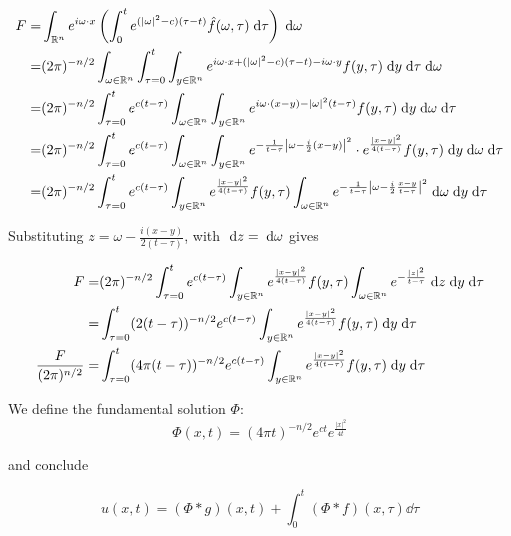\begin{align*}
F = &\int_{\mathbb{R}^n} e^{i \omega \cdot x} \left( \int_0^t e^{(|\omega|^2 - c) (\tau - t)} \hat{f}(\omega, \tau) \;\mathrm{d}\tau \right) \;\mathrm{d}\omega\\
  = &(2 \pi)^{-n / 2} \int_{\omega \in \mathbb{R}^n}
                       \int_{\tau = 0}^t
                         \int_{y \in \mathbb{R}^n}
                           e^{i \omega \cdot x + (|\omega|^2 - c) (\tau - t) - i \omega \cdot y} f(y, \tau) \;\mathrm{d}y \;\mathrm{d}\tau \;\mathrm{d}\omega\\
  = &(2 \pi)^{-n / 2} \int_{\tau = 0}^t
                       e^{c (t - \tau)}
                       \int_{\omega \in \mathbb{R}^n}
                         \int_{y \in \mathbb{R}^n}
                           e^{i \omega \cdot (x - y) - |\omega|^2 (t - \tau)} f(y, \tau) \;\mathrm{d}y \;\mathrm{d}\omega \;\mathrm{d}\tau\\
  = &(2 \pi)^{-n / 2} \int_{\tau = 0}^t
                       e^{c (t - \tau)}
                       \int_{\omega \in \mathbb{R}^n}
                         \int_{y \in \mathbb{R}^n}
                           e^{-\frac{1}{t - \tau} \left| \omega - \frac{i}{2} (x - y)\right|^2}
                           \cdot e^{\frac{|x - y|^2}{4 (t - \tau)}} f(y, \tau) \;\mathrm{d}y \;\mathrm{d}\omega \;\mathrm{d}\tau\\
  = &(2 \pi)^{-n / 2} \int_{\tau = 0}^t
                       e^{c (t - \tau)}
                       \int_{y \in \mathbb{R}^n}
                         e^{\frac{|x - y|^2}{4 (t - \tau)}} f(y, \tau)
                         \int_{\omega \in \mathbb{R}^n}
                           e^{-\frac{1}{t - \tau} \left| \omega - \frac{i}{2} \frac{x - y}{t - \tau}\right|^2} \;\mathrm{d}\omega \;\mathrm{d}y \;\mathrm{d}\tau\\
\end{align*}

Substituting $z = \omega - \frac{i (x - y)}{2 (t - \tau)}$, with $\;\mathrm{d}z = \;\mathrm{d}\omega$ gives

\begin{align*}
F = &(2 \pi)^{-n / 2} \int_{\tau = 0}^t
                       e^{c (t - \tau)}
                       \int_{y \in \mathbb{R}^n}
                         e^{\frac{|x - y|^2}{4 (t - \tau)}} f(y, \tau)
                         \int_{\omega \in \mathbb{R}^n}
                           e^{-\frac{|z|^2}{t - \tau}} \;\mathrm{d}z \;\mathrm{d}y \;\mathrm{d}\tau\\
  = &\int_{\tau = 0}^t (2 (t - \tau))^{-n / 2} e^{c (t - \tau)}
       \int_{y \in \mathbb{R}^n} e^{\frac{|x - y|^2}{4 (t - \tau)}} f(y, \tau) \;\mathrm{d}y \;\mathrm{d}\tau\\
\frac{F}{(2 \pi)^{n / 2}} = &\int_{\tau = 0}^t (4 \pi (t - \tau))^{-n / 2} e^{c (t - \tau)}
                              \int_{y \in \mathbb{R}^n} e^{\frac{|x - y|^2}{4 (t - \tau)}} f(y, \tau) \;\mathrm{d}y \;\mathrm{d}\tau\\
\end{align*}

We define the fundamental solution $\Phi$:
$$
\Phi(x, t) = (4 \pi t)^{-n / 2} e^{c t}  e^{\frac{|x|^2}{4 t}}
$$

and conclude

$$
u(x, t) = (\Phi * g)(x, t) + \int_0^t (\Phi * f)(x, \tau) \dd{\tau}
$$
